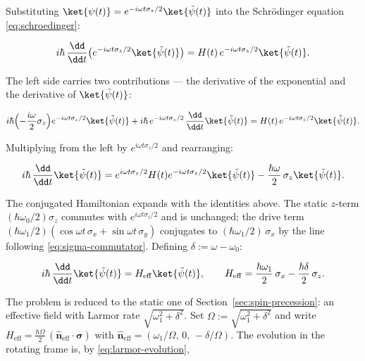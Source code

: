 Substituting $\ket{\psi(t)} = e^{-i\omega t\sigma_z/2}\ket{\tilde\psi(t)}$ into the Schr\"odinger equation \eqref{eq:schroedinger}:
\begin{linenomath}
    \begin{equation*}
        i\hbar\,\frac{\dd}{\dd t}\bigl(e^{-i\omega t\sigma_z/2}\ket{\tilde\psi(t)}\bigr)
        = H(t)\,e^{-i\omega t\sigma_z/2}\ket{\tilde\psi(t)} .
    \end{equation*}
\end{linenomath}
The left side carries two contributions --- the derivative of the exponential and the derivative of $\ket{\tilde\psi(t)}$:
\begin{linenomath}
    \begin{equation*}
        i\hbar\Bigl(-\frac{i\omega}{2}\sigma_z\Bigr)e^{-i\omega t\sigma_z/2}\ket{\tilde\psi(t)}
        + i\hbar\,e^{-i\omega t\sigma_z/2}\,\frac{\dd}{\dd t}\ket{\tilde\psi(t)}
        = H(t)\,e^{-i\omega t\sigma_z/2}\ket{\tilde\psi(t)} .
    \end{equation*}
\end{linenomath}
Multiplying from the left by $e^{i\omega t\sigma_z/2}$ and rearranging:
\begin{linenomath}
    \begin{equation*}
        i\hbar\,\frac{\dd}{\dd t}\ket{\tilde\psi(t)}
        = e^{i\omega t\sigma_z/2}H(t)e^{-i\omega t\sigma_z/2}\ket{\tilde\psi(t)}
          - \frac{\hbar\omega}{2}\,\sigma_z\ket{\tilde\psi(t)} .
    \end{equation*}
\end{linenomath}
The conjugated Hamiltonian expands with the identities above. The static $z$-term $(\hbar\omega_0/2)\sigma_z$ commutes with $e^{i\omega t\sigma_z/2}$ and is unchanged; the drive term $(\hbar\omega_1/2)(\cos\omega t\,\sigma_x + \sin\omega t\,\sigma_y)$ conjugates to $(\hbar\omega_1/2)\,\sigma_x$ by the line following \eqref{eq:sigma-commutator}. Defining $\delta := \omega - \omega_0$:
\begin{linenomath}
    \begin{equation*}
        i\hbar\,\frac{\dd}{\dd t}\ket{\tilde\psi(t)} = H_{\mathrm{eff}}\ket{\tilde\psi(t)}, \qquad H_{\mathrm{eff}} = \frac{\hbar\omega_1}{2}\,\sigma_x - \frac{\hbar\delta}{2}\,\sigma_z .
    \end{equation*}
\end{linenomath}
The problem is reduced to the static one of Section~\ref{sec:spin-precession}: an effective field with Larmor rate $\sqrt{\omega_1^2 + \delta^2}$. Set $\Omega := \sqrt{\omega_1^2 + \delta^2}$ and write $H_{\mathrm{eff}} = \frac{\hbar\Omega}{2}\,(\hat{\bm n}_{\mathrm{eff}}\!\cdot\!\bm\sigma)$ with $\hat{\bm n}_{\mathrm{eff}} = (\omega_1/\Omega,\,0,\,-\delta/\Omega)$. The evolution in the rotating frame is, by \eqref{eq:larmor-evolution},
